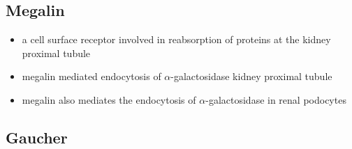 \documentclass{scrartcl}
\begin{document}
\subsection{Megalin}
\label{sec:org26c9dbf}
\begin{itemize}
\item a cell surface receptor involved in reabsorption of proteins at the kidney proximal tubule
\item megalin mediated endocytosis of \(\alpha\)-galactosidase kidney proximal tubule
\item megalin also mediates the endocytosis of \(\alpha\)-galactosidase in renal podocytes
\end{itemize}

\subsection{Gaucher}
\label{sec:org1037363}
\end{document}
